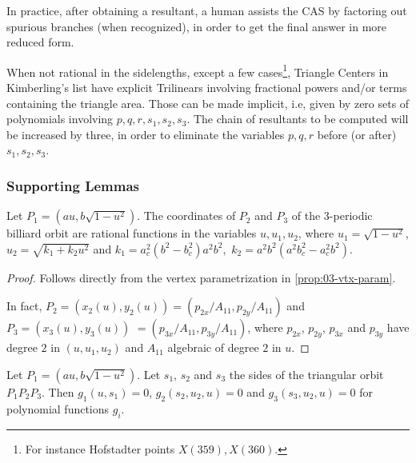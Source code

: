 \begin{remark}
In practice,  after  obtaining  a resultant, a human assists the CAS by factoring out spurious branches
(when recognized), in order to get the final answer in more reduced form.   
\end{remark}

When not rational in the sidelengths, except a few cases\footnote{For instance Hofstadter points $X(359), X(360)$.}, Triangle Centers
in Kimberling's list have explicit Trilinears involving fractional powers and/or terms containing the triangle area. Those can be made implicit, i.e,
given by zero sets of polynomials involving $p,q,r, s_1, s_2, s_3$.  The chain of resultants to be computed will be increased by three, in order to eliminate the variables $p,q, r$ before (or after) $s_1, s_2, s_3$.

\subsubsection{Supporting Lemmas}
\label{sec:supporting-lemmas}

\begin{lemma}
\label{lem:1coord}
Let $P_1=({a}{u},b\sqrt{1-u^2}).$
	The coordinates of $P_2$ and $P_3$ of the 3-periodic billiard orbit are rational functions in the variables $u, u_1, u_2$, where
	$u_1=\sqrt{1-u^2}$, $u_2=\sqrt{k_1+k_2 u^2}$ 
and
	$k_1= a_c^2(b^2 - b_c^2)a^2b^2,$ $ k_2= a^2b^2(a^2b_c^2 - a_c^2b^2)$.  
		
	\end{lemma}
	
	\begin{proof}
	Follows directly from the vertex parametrization in \cref{prop:03-vtx-param}.
 
	In fact,  $P_2=(x_2(u),y_2(u)) =( p_{2x}/A_{11}, p_{2y}/A_{11})$ and $P_3=(x_3(u),y_3(u))$ $=( p_{3x}/A_{11}, p_{3y}/A_{11})$, where $p_{2x}$, $p_{2y}$, $p_{3x}$ and $p_{3y}$ have degree $2$ in $(u,u_1,u_2)$  and $A_{11}$ algebraic of degree $2$ in $u$. 
\end{proof}
	
\begin{lemma}
\label{lem:2sides} Let $P_1=(a u,b\sqrt{1-u^2}).$ Let $s_1$, $s_2$ and $s_3$ the sides of the triangular orbit ${P_1}{P_2}{P_3}$. Then $g_1(u,s_1)=0$, $g_2(s_2,u_2,u)=0$ and $g_3(s_3,u_2,u)=0$ for polynomial functions $g_i$.  
\end{lemma}
	
